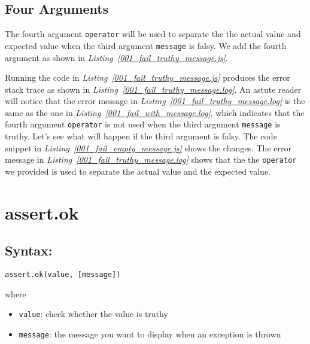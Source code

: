 \subsection{Four Arguments}
The fourth argument \texttt{operator} will be used to separate the the actual value and expected value when the third argument \texttt{message} is falsy. We add the fourth argument as shown in \textit{Listing~\ref{001_fail_truthy_message.js}}.

Running the code in \textit{Listing~\ref{001_fail_truthy_message.js}} produces the error stack trace as shown in \textit{Listing~\ref{001_fail_truthy_message.log}}.
An astute reader will notice that the error message in \textit{Listing~\ref{001_fail_truthy_message.log}} is the same as the one in \textit{Listing~\ref{001_fail_with_message.log}}, which indicates that the fourth argument \texttt{operator} is not used when the third argument \texttt{message} is truthy. Let's see what will happen if the third argument is falsy. The code snippet in \textit{Listing~\ref{001_fail_empty_message.js}} shows the changes.
The error message in \textit{Listing~\ref{001_fail_truthy_message.log}} shows that the the \texttt{operator} we provided is used to separate the actual value and the expected value.
\section{assert.ok}
\subsection*{Syntax:}
\begin{center}\texttt{assert.ok(value, [message])}

\end{center}where
\begin{itemize}
\item \texttt{value}: check whether the value is truthy
\item \texttt{message}: the message you want to display when an exception is thrown
\end{itemize}

